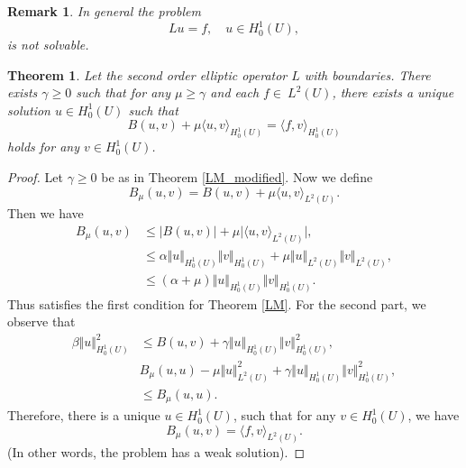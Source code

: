 \documentclass{article}
\newtheorem{theorem}{Theorem}[section]
\newtheorem{remark}{Remark}[section]
\numberwithin{equation}{section}
\begin{document}
\begin{remark}
In general the problem
\begin{equation*}
Lu=f,\quad u\in H_0^1(U),
\end{equation*}
is not solvable. 
\end{remark}

\begin{theorem}
Let the second order elliptic operator $L$ with boundaries. There exists $\gamma\geq 0$ such that for any $\mu\geq\gamma$ and each $f\in\ L^2(U)$, there exists a unique solution $u\in H_0^1(U)$ such that
\begin{equation*}
B(u,v)+\mu\langle u,v\rangle_{H_0^1(U)}=\langle f, v\rangle_{H_0^1(U)}
\end{equation*}
holds for any $v\in H_0^1(U)$. 
\end{theorem}

\begin{proof}
Let $\gamma\geq 0$ be as in Theorem \ref{LM_modified}. Now we define
\begin{equation*}
B_\mu(u,v) = B(u,v) +\mu\langle u,v\rangle_{L^2(U)}.
\end{equation*}
Then we have
\begin{align*}
B_\mu(u,v)&\leq \vert B(u,v)\vert+\mu\vert\langle u,v\rangle_{L^2(U)}\vert,\\
&\leq\alpha\Vert u \Vert_{H_0^1(U)}\Vert v\Vert_{H_0^1(U)}+\mu \Vert u\Vert_{L^2(U)}\Vert v\Vert_{L^2(U)},\\
& \leq (\alpha+\mu)\Vert u \Vert_{H_0^1(U)}\Vert v\Vert_{H_0^1(U)}.
\end{align*}
Thus satisfies the first condition for Theorem \ref{LM}. For the second part, we observe that
\begin{align*}
\beta\Vert u \Vert_{H_0^1(U)}^2&\leq B(u,v)+\gamma\Vert u \Vert_{H_0^1(U)}\Vert v\Vert_{H_0^1(U)}^2,\\
& B_\mu(u,u)-\mu\Vert u\Vert_{L^2(U)}^2+\gamma\Vert u \Vert_{H_0^1(U)}\Vert v\Vert_{H_0^1(U)}^2,\\
&\leq B_\mu(u,u).
\end{align*}
Therefore, there is a unique $u\in H_0^1(U)$, such that for any $v\in H_0^1(U)$, we have
\begin{equation*}
B_\mu(u,v) = \langle f,v\rangle_{L^2(U)}.
\end{equation*}
(In other words, the problem has a weak solution).
\end{proof}
\end{document}
